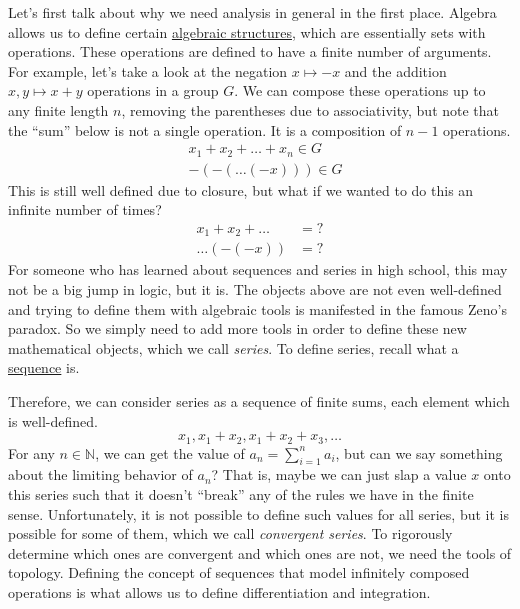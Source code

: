 Let's first talk about why we need analysis in general in the first place. Algebra allows us to define certain \hyperref[alg-def:algebraic-structure]{algebraic structures}, which are essentially sets with operations. These operations are defined to have a finite number of arguments. For example, let's take a look at the negation $x \mapsto -x$ and the addition $x, y \mapsto x + y$ operations in a group $G$. We can compose these operations up to any finite length $n$, removing the parentheses due to associativity, but note that the ``sum'' below is not a single operation. It is a composition of $n-1$ operations. 
\begin{align}
  & x_1 + x_2 + \ldots + x_n \in G  \\
  & -(-(\ldots(-x))) \in G
\end{align} 
This is still well defined due to closure, but what if we wanted to do this an infinite number of times? 
\begin{align}
  x_1 + x_2 + \ldots & = ? \\
  \ldots(-(-x)) & = ? 
\end{align} 
For someone who has learned about sequences and series in high school, this may not be a big jump in logic, but it is. The objects above are not even well-defined and trying to define them with algebraic tools is manifested in the famous Zeno's paradox. So we simply need to add more tools in order to define these new mathematical objects, which we call \textit{series}. To define series, recall what a \hyperref[st-def:sequence]{sequence} is. 

Therefore, we can consider series as a sequence of finite sums, each element which is well-defined. 
\begin{equation}
  x_1, x_1 + x_2, x_1 + x_2 + x_3, \ldots
\end{equation} 
For any $n \in \mathbb{N}$, we can get the value of $a_n = \sum_{i=1}^n a_i$, but can we say something about the limiting behavior of $a_n$? That is, maybe we can just slap a value $x$ onto this series such that it doesn't ``break'' any of the rules we have in the finite sense. Unfortunately, it is not possible to define such values for all series, but it is possible for some of them, which we call \textit{convergent series}. To rigorously determine which ones are convergent and which ones are not, we need the tools of topology. Defining the concept of sequences that model infinitely composed operations is what allows us to define differentiation and integration. 

